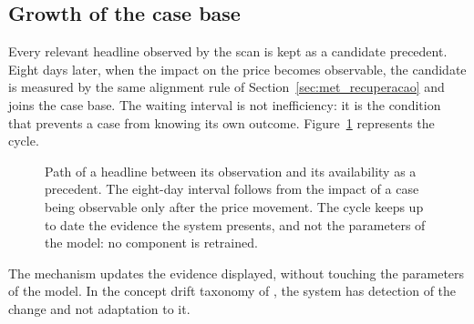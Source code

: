 \subsection{Growth of the case base}
\label{sec:sis_base}

Every relevant headline observed by the scan is kept as a candidate precedent. Eight days later,
when the impact on the price becomes observable, the candidate is measured by the same alignment
rule of Section~\ref{sec:met_recuperacao} and joins the case base. The waiting interval is not
inefficiency: it is the condition that prevents a case from knowing its own outcome.
Figure~\ref{fig:sis_ciclo_kb} represents the cycle.

\begin{figure}[htbp]
\centering
{}
\caption[Growth cycle of the case base]{Path of a headline between its observation and its
availability as a precedent. The eight-day interval follows from the impact of a case being
observable only after the price movement. The cycle keeps up to date the evidence the system
presents, and not the parameters of the model: no component is retrained.}
\label{fig:sis_ciclo_kb}
\end{figure}

The mechanism updates the evidence displayed, without touching the parameters of the model. In the concept
drift taxonomy of \textcite{gama2014survey}, the system has detection of the change and not
adaptation to it.

